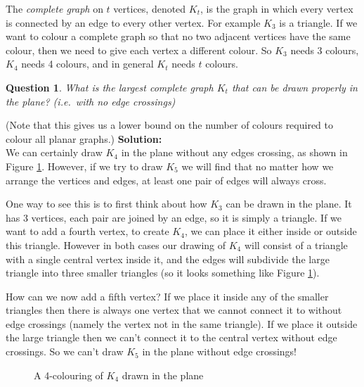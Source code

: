 \documentclass[12pt]{article}
\newtheorem{question}{Question}
\newif\iffullversion
\begin{document}
The \emph{complete graph} on $t$ vertices, denoted $K_t$, is the graph in which every vertex is connected by an edge to every other vertex. For example $K_3$ is a triangle. If we want to colour a complete graph so that no two adjacent vertices have the same colour, then we need to give each vertex a different colour. So $K_3$ needs 3 colours, $K_4$ needs 4 colours, and in general $K_t$ needs $t$ colours. 
\begin{question}
What is the largest complete graph $K_t$ that can be drawn properly in the plane? (i.e.~with no edge crossings)
\end{question}
(Note that this gives us a lower bound on the number of colours required to colour all planar graphs.)
\iffullversion
\textbf{Solution:\\}
We can certainly draw $K_4$ in the plane without any edges crossing, as shown in Figure \ref{K4}. However, if we try to draw $K_5$ we will find that no matter how we arrange the vertices and edges, at least one pair of edges will always cross. 

One way to see this is to first think about how $K_3$ can be drawn in the plane. It has 3 vertices, each pair are joined by an edge, so it is simply a triangle. If we want to add a fourth vertex, to create $K_4$, we can place it either inside or outside this triangle. However in both cases our drawing of $K_4$ will consist of a triangle with a single central vertex inside it, and the edges will subdivide the large triangle into three smaller triangles (so it looks something like Figure \ref{K4}).

How can we now add a fifth vertex? If we place it inside any of the smaller triangles then there is always one vertex that we cannot connect it to without edge crossings (namely the vertex not in the same triangle). If we place it outside the large triangle then we can't connect it to the central vertex without edge crossings. So we can't draw $K_5$ in the plane without edge crossings!
\begin{figure}[h]
\begin{center}
\end{center}
\caption{A 4-colouring of $K_4$ drawn in the plane}\label{K4}
\end{figure}
\end{document}

